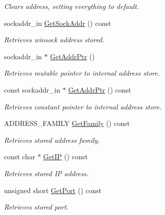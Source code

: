 \begin{DoxyCompactItemize}
\begin{DoxyCompactList}\small\item\em Clears address, setting everything to default. \item\end{DoxyCompactList}\item 
sockaddr\_\-in \hyperlink{class_net_address_ab0a0c10c2768f6f5bd6532c5a736f1e2}{GetSockAddr} () const 
\begin{DoxyCompactList}\small\item\em Retrieves winsock address stored. \item\end{DoxyCompactList}\item 
sockaddr\_\-in $\ast$ \hyperlink{class_net_address_a04fbd8740465d5d64ab8bec440b7f0a1}{GetAddrPtr} ()
\begin{DoxyCompactList}\small\item\em Retrieves mutable pointer to internal address store. \item\end{DoxyCompactList}\item 
const sockaddr\_\-in $\ast$ \hyperlink{class_net_address_a8642b2cf64aaaac8fa15d988e022cf24}{GetAddrPtr} () const 
\begin{DoxyCompactList}\small\item\em Retrieves constant pointer to internal address store. \item\end{DoxyCompactList}\item 
ADDRESS\_\-FAMILY \hyperlink{class_net_address_a90f4288662c8528b85aa301d81629b85}{GetFamily} () const 
\begin{DoxyCompactList}\small\item\em Retrieves stored address family. \item\end{DoxyCompactList}\item 
const char $\ast$ \hyperlink{class_net_address_a7b868c36c3e1406e17d515c019db9e41}{GetIP} () const 
\begin{DoxyCompactList}\small\item\em Retrieves stored IP address. \item\end{DoxyCompactList}\item 
unsigned short \hyperlink{class_net_address_a566dbd2214680b2ddbf735527b9972a3}{GetPort} () const 
\begin{DoxyCompactList}\small\item\em Retrieves stored port. \item\end{DoxyCompactList}\item 

\end{DoxyCompactItemize}

